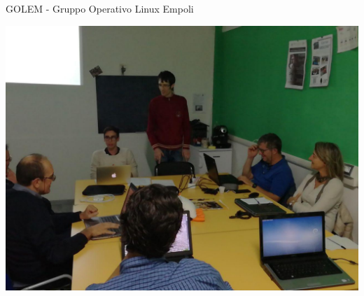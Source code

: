 \documentclass{beamer}
\begin{document}
\begin{frame}
\begin{block}{GOLEM - Gruppo Operativo Linux Empoli}
\begin{minipage}{.15\linewidth}
            \includegraphics[width=1\linewidth]{img/GOLEM-foto.jpeg}
        \end{minipage}
    \end{block}


\end{frame}
\end{document}
